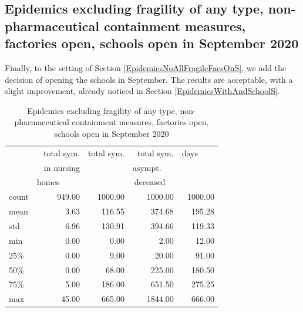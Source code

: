 \documentclass[11pt]{article}
\begin{document}
\subsection{Epidemics excluding fragility of any type, non-pharmaceutical containment measures, factories open, schools open in September 2020}
\label{EpidemicsNoAllFragileFacsOnSchOnS}

Finally, to the setting of Section \ref{EpidemicsNoAllFragileFacsOnS}, we add the decision of opening the schools in September. The results are acceptable, with a slight improvement, already noticed in Section \ref{EpidemicsWithAndSchoolS}.

\begin{table}[H]
\center
\small
\begin{tabular}{lrrrr}
\toprule
{} & total sym.        &  total sym. & total sym.     & days~~~~ \\
{} & in nursing        &                  & asympt.~~~  & \\
{} & homes~~~~~  &                  & deceased~~ & \\
\midrule
count &     949.00 &             1000.00 &                 1000.00 & 1000.00 \\
mean  &       3.63 &              116.55 &                  374.68 &  195.28 \\
std   &       6.96 &              130.91 &                  394.66 &  119.33 \\
min   &       0.00 &                0.00 &                    2.00 &   12.00 \\
25\%   &       0.00 &                9.00 &                   20.00 &   91.00 \\
50\%   &       0.00 &               68.00 &                  225.00 &  180.50 \\
75\%   &       5.00 &              186.00 &                  651.50 &  275.25 \\
max   &      45.00 &              665.00 &                 1844.00 &  666.00 \\
\bottomrule
\end{tabular}

\label{EpidemicsNoAllFragileFacsOnSchOnT}
\caption{Epidemics excluding fragility of any type, non-pharmaceutical containment measures, factories open, schools open in September 2020}
\end{table}
\end{document}
